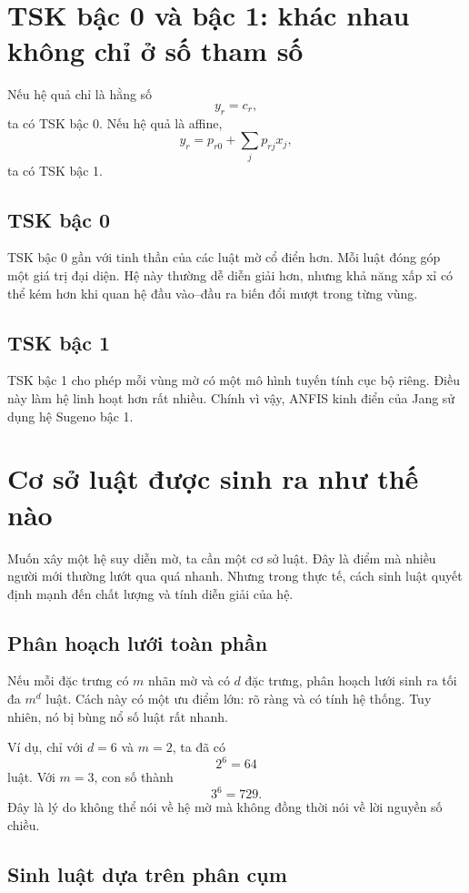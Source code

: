 \section{TSK bậc 0 và bậc 1: khác nhau không chỉ ở số tham số}

Nếu hệ quả chỉ là hằng số
\[
y_r=c_r,
\]
ta có TSK bậc 0. Nếu hệ quả là affine,
\[
y_r=p_{r0}+\sum_j p_{rj}x_j,
\]
ta có TSK bậc 1.

\subsection{TSK bậc 0}

TSK bậc 0 gần với tinh thần của các luật mờ cổ điển hơn. Mỗi luật đóng góp một giá trị đại diện. Hệ này thường dễ diễn giải hơn, nhưng khả năng xấp xỉ có thể kém hơn khi quan hệ đầu vào--đầu ra biến đổi mượt trong từng vùng.

\subsection{TSK bậc 1}

TSK bậc 1 cho phép mỗi vùng mờ có một mô hình tuyến tính cục bộ riêng. Điều này làm hệ linh hoạt hơn rất nhiều. Chính vì vậy, ANFIS kinh điển của Jang \citep{jang1993anfis} sử dụng hệ Sugeno bậc 1.

\section{Cơ sở luật được sinh ra như thế nào}

Muốn xây một hệ suy diễn mờ, ta cần một cơ sở luật. Đây là điểm mà nhiều người mới thường lướt qua quá nhanh. Nhưng trong thực tế, cách sinh luật quyết định mạnh đến chất lượng và tính diễn giải của hệ.

\subsection{Phân hoạch lưới toàn phần}

Nếu mỗi đặc trưng có \(m\) nhãn mờ và có \(d\) đặc trưng, phân hoạch lưới sinh ra tối đa \(m^d\) luật. Cách này có một ưu điểm lớn: rõ ràng và có tính hệ thống. Tuy nhiên, nó bị bùng nổ số luật rất nhanh.

Ví dụ, chỉ với \(d=6\) và \(m=2\), ta đã có
\[
2^6=64
\]
luật. Với \(m=3\), con số thành
\[
3^6=729.
\]
Đây là lý do không thể nói về hệ mờ mà không đồng thời nói về lời nguyền số chiều.

\subsection{Sinh luật dựa trên phân cụm}

